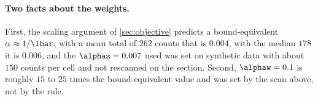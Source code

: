 \paragraph{Two facts about the weights.} First, the scaling argument of \cref{sec:objective} predicts a bound-equivalent $\alpha \approx 1/\lbar$; with a mean total of $262$ counts that is $0.004$, with the median $178$ it is $0.006$, and the $\alphaz = 0.007$ used was set on synthetic data with about $150$ counts per cell and not rescanned on the section.  Second, $\alphaw = 0.1$ is roughly $15$ to $25$ times the bound-equivalent value and was set by the scan above, not by the rule.
